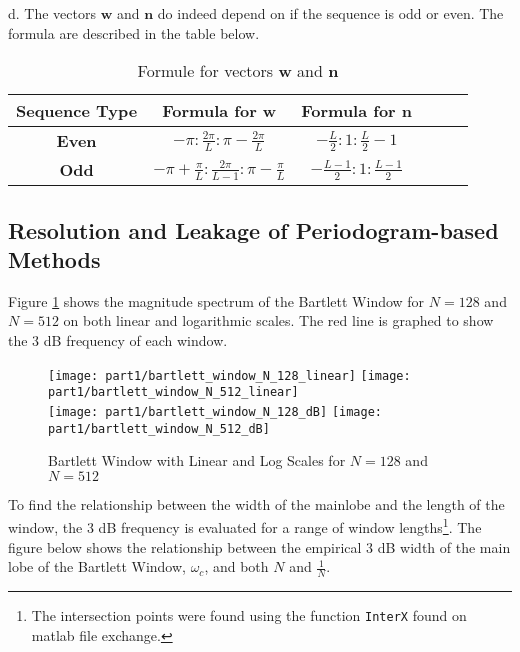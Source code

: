 \noindent{}d. The vectors $\textbf{w}$ and $\textbf{n}$ do indeed depend on if the sequence is odd or even. The formula are described in the table below.

\begin{table}[H]
  \centering
    \begin{tabular}{|c|c|c|c|c|c|}
        \hline
        \textbf{Sequence Type} & \textbf{Formula for $\textbf{w}$} & \textbf{Formula for $\textbf{n}$} \\
        \hline
        \textbf{Even} & $-\pi:\frac{2\pi}{L}:\pi-\frac{2\pi}{L}$ & $-\frac{L}{2}:1:\frac{L}{2}-1$ \\
        \hline
        \textbf{Odd} & $-\pi+\frac{\pi}{L}:\frac{2\pi}{L-1}:\pi-\frac{\pi}{L}$ & $-\frac{L-1}{2}:1:\frac{L-1}{2}$ \\
        \hline
    \end{tabular}%
  \caption{Formule for vectors $\textbf{w}$ and $\textbf{n}$}
\end{table}%


\subsection{Resolution and Leakage of Periodogram-based Methods}


\noindent{}Figure \ref{fig:bartlett_window_log_linear} shows the magnitude spectrum of the Bartlett Window for $N=128$ and $N=512$ on both linear and logarithmic scales. The red line is graphed to show the 3 dB frequency of each window. 

\begin{figure}[H]
\centering{}
\texttt{[image: part1/bartlett\_window\_N\_128\_linear]}
\texttt{[image: part1/bartlett\_window\_N\_512\_linear]} \\
\texttt{[image: part1/bartlett\_window\_N\_128\_dB]}
\texttt{[image: part1/bartlett\_window\_N\_512\_dB]}
\caption{Bartlett Window with Linear and Log Scales for $N=128$ and $N=512$}
\label{fig:bartlett_window_log_linear}
\end{figure}

\noindent{}To find the relationship between the width of the mainlobe and the length of the window, the 3 dB frequency is evaluated for a range of window lengths\footnote{The intersection points were found using the function \texttt{InterX} found on matlab file exchange.}. The figure below shows the relationship between the empirical 3 dB width of the main lobe of the Bartlett Window, $\omega_{c}$, and both $N$ and $\frac{1}{N}$. 


